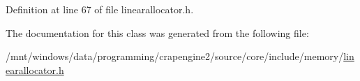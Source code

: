 Definition at line 67 of file linearallocator.\+h.



The documentation for this class was generated from the following file\+:\begin{DoxyCompactItemize}
\item 
/mnt/windows/data/programming/crapengine2/source/core/include/memory/\hyperlink{linearallocator_8h}{linearallocator.\+h}\end{DoxyCompactItemize}
